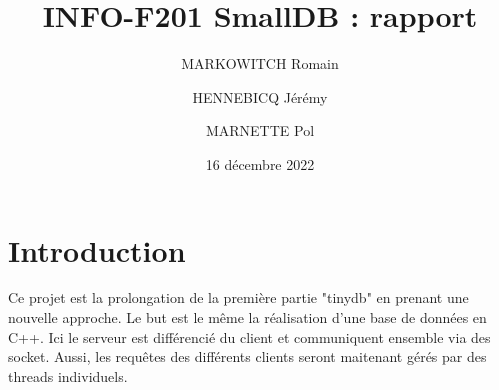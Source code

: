 \documentclass[utf8]{article}
\title{INFO-F201 SmallDB : rapport}
\author{MARKOWITCH Romain \and HENNEBICQ Jérémy\and MARNETTE Pol}
\date{16 décembre 2022}
\begin{document}
\maketitle
\tableofcontents

\newpage


\section{Introduction}

Ce projet est la prolongation de la première partie "tinydb" en prenant une nouvelle approche. Le but est le même la réalisation d'une base de données en C++. Ici le serveur est différencié du client et communiquent ensemble via des socket. Aussi, les requêtes des différents clients seront maitenant gérés par des threads individuels.
\end{document}
